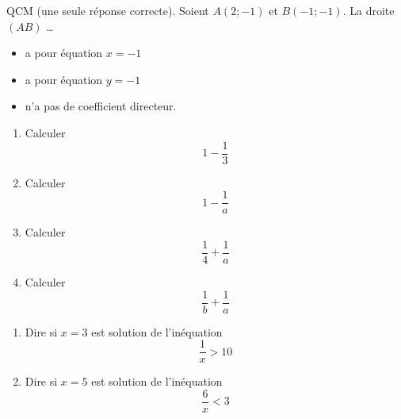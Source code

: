 \begin{MentalActivity}

\begin{mental}
            QCM (une seule réponse correcte). Soient \( A(2;-1)\) et \( B(-1;-1)\). La droite \( (AB)\) \ldots
            \begin{itemize}
                \item
                    a pour équation \( x=-1\)
                \item
                    a pour équation \( y=-1\)
                \item
                    n'a pas de coefficient directeur.
            \end{itemize}
\end{mental}

\begin{mental}
    \begin{enumerate}
        \item
            Calculer 
            \begin{equation*}
                1- \frac{1}{ 3 }
            \end{equation*}
        \item
            Calculer 
            \begin{equation*}
                1- \frac{1}{ a }
            \end{equation*}
        \item
            Calculer 
            \begin{equation*}
                \frac{1}{ 4 }+\frac{1}{ a }
            \end{equation*}
        \item
            Calculer
            \begin{equation*}
                \frac{1}{ b }+\frac{1}{ a }
            \end{equation*}
    \end{enumerate}
\end{mental}

\begin{mental}
    \begin{enumerate}
        \item
            Dire si \( x=3\) est solution de l'inéquation
            \begin{equation}
                \frac{1}{ x }>10
            \end{equation}
        \item
            Dire si \( x=5\) est solution de l'inéquation
            \begin{equation*}
                \frac{ 6 }{ x }<3
            \end{equation*}
    \end{enumerate}
\end{mental}


\end{MentalActivity}
